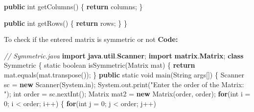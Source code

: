 \documentclass[
  12pt,
]{article}
\newenvironment{Shaded}{}{}
\newcommand{\BuiltInTok}[1]{\textcolor[rgb]{0.00,0.50,0.00}{#1}}
\newcommand{\CommentTok}[1]{\textcolor[rgb]{0.38,0.63,0.69}{\textit{#1}}}
\newcommand{\ControlFlowTok}[1]{\textcolor[rgb]{0.00,0.44,0.13}{\textbf{#1}}}
\newcommand{\DataTypeTok}[1]{\textcolor[rgb]{0.56,0.13,0.00}{#1}}
\newcommand{\DecValTok}[1]{\textcolor[rgb]{0.25,0.63,0.44}{#1}}
\newcommand{\FunctionTok}[1]{\textcolor[rgb]{0.02,0.16,0.49}{#1}}
\newcommand{\ImportTok}[1]{\textcolor[rgb]{0.00,0.50,0.00}{\textbf{#1}}}
\newcommand{\KeywordTok}[1]{\textcolor[rgb]{0.00,0.44,0.13}{\textbf{#1}}}
\newcommand{\NormalTok}[1]{#1}
\newcommand{\OperatorTok}[1]{\textcolor[rgb]{0.40,0.40,0.40}{#1}}
\newcommand{\StringTok}[1]{\textcolor[rgb]{0.25,0.44,0.63}{#1}}
\begin{document}
\begin{Shaded}
\begin{Highlighting}[numbers=left,,]
    \KeywordTok{public} \DataTypeTok{int} \FunctionTok{getColumns}\OperatorTok{()}
    \OperatorTok{\{}
        \ControlFlowTok{return}\NormalTok{ columns}\OperatorTok{;}
    \OperatorTok{\}}

    \KeywordTok{public} \DataTypeTok{int} \FunctionTok{getRows}\OperatorTok{()}
    \OperatorTok{\{}
        \ControlFlowTok{return}\NormalTok{ rows}\OperatorTok{;}
    \OperatorTok{\}}
\OperatorTok{\}}
\end{Highlighting}
\end{Shaded}

To check if the entered matrix is symmetric or not \textbf{Code:}

\begin{Shaded}
\begin{Highlighting}[numbers=left,,]
\CommentTok{// Symmetric.java}
\KeywordTok{import} \ImportTok{java}\OperatorTok{.}\ImportTok{util}\OperatorTok{.}\ImportTok{Scanner}\OperatorTok{;}
\KeywordTok{import} \ImportTok{matrix}\OperatorTok{.}\ImportTok{Matrix}\OperatorTok{;}
\KeywordTok{class}\NormalTok{ Symmetric}
\OperatorTok{\{}
    \DataTypeTok{static} \DataTypeTok{boolean} \FunctionTok{isSymmetric}\OperatorTok{(}\NormalTok{Matrix mat}\OperatorTok{)}
    \OperatorTok{\{}
        \ControlFlowTok{return}\NormalTok{ mat}\OperatorTok{.}\FunctionTok{equals}\OperatorTok{(}\NormalTok{mat}\OperatorTok{.}\FunctionTok{transpose}\OperatorTok{());}
    \OperatorTok{\}}
    \KeywordTok{public} \DataTypeTok{static} \DataTypeTok{void} \FunctionTok{main}\OperatorTok{(}\BuiltInTok{String}\NormalTok{ args}\OperatorTok{[])}
    \OperatorTok{\{}
        \BuiltInTok{Scanner}\NormalTok{ sc }\OperatorTok{=} \KeywordTok{new} \BuiltInTok{Scanner}\OperatorTok{(}\BuiltInTok{System}\OperatorTok{.}\FunctionTok{in}\OperatorTok{);}
        \BuiltInTok{System}\OperatorTok{.}\FunctionTok{out}\OperatorTok{.}\FunctionTok{print}\OperatorTok{(}\StringTok{"Enter the order of the Matrix: "}\OperatorTok{);}
        \DataTypeTok{int}\NormalTok{ order }\OperatorTok{=}\NormalTok{ sc}\OperatorTok{.}\FunctionTok{nextInt}\OperatorTok{();}
\NormalTok{        Matrix mat2 }\OperatorTok{=} \KeywordTok{new} \FunctionTok{Matrix}\OperatorTok{(}\NormalTok{order}\OperatorTok{,}\NormalTok{ order}\OperatorTok{);}
        \ControlFlowTok{for}\OperatorTok{(}\DataTypeTok{int}\NormalTok{ i }\OperatorTok{=} \DecValTok{0}\OperatorTok{;}\NormalTok{ i }\OperatorTok{\textless{}}\NormalTok{ order}\OperatorTok{;}\NormalTok{ i}\OperatorTok{++)}
        \OperatorTok{\{}
            \ControlFlowTok{for}\OperatorTok{(}\DataTypeTok{int}\NormalTok{ j }\OperatorTok{=} \DecValTok{0}\OperatorTok{;}\NormalTok{ j }\OperatorTok{\textless{}}\NormalTok{ order}\OperatorTok{;}\NormalTok{ j}\OperatorTok{++)}

\end{Highlighting}
\end{Shaded}
\end{document}
